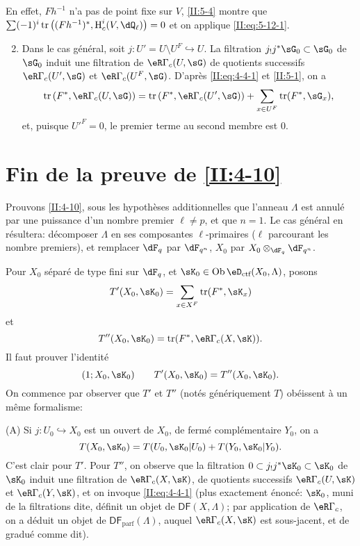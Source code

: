 En effet, $F h^{-1}$ n'a pas de point fixe sur $V$, \ref{II:5-4} montre que 
$\sum (-1)^i \tr\left((F h^{-1})^*,\h_c^i(V,\dQ_\ell)\right)=0$ et on 
applique \eqref{II:eq:5-12-1}.
\begin{enumerate}[\indent A.]
\setcounter{enumi}{1}
  \item Dans le cas général, soit $j:U'=U\setminus U^F\hookrightarrow U$. 
    La filtration  $j_! j^* \sG_0\subset \sG_0$ de $\sG_0$ induit une 
    filtration de $\eR\Gamma_c(U,\sG)$ de quotients successifs 
    $\eR\Gamma_c(U',\sG)$ et $\eR\Gamma_c(U^F,\sG)$. D'après \eqref{II:eq:4-4-1} 
    et \ref{II:5-1}, on a 
    \[
      \tr\left(F^*,\eR\Gamma_c(U,\sG)\right) = \tr\left(F^*,\eR\Gamma_c(U',\sG)\right) + \sum_{x\in U^F} \tr(F^*,\sG_x) \text{,}
    \]
    et, puisque ${U'}^F=0$, le premier terme au second membre est $0$. 
\end{enumerate}










\section{Fin de la preuve de \ref{II:4-10}}\label{II:6}

Prouvons \ref{II:4-10}, sous les hypothèses additionnelles que l'anneau 
$\Lambda$ est annulé par une puissance d'un nombre premier $\ell\ne p$, et 
que $n=1$. Le cas général en résultera: décomposer $\Lambda$ en ses 
composantes $\ell$-primaires ($\ell$ parcourant les nombre premiers), et 
remplacer $\dF_q$ par $\dF_{q^n}$, $X_0$ par $X_0\otimes_{\dF_q}\dF_{q^n}$. 

Pour $X_0$ séparé de type fini sur $\dF_q$, et 
$\sK_0\in\ob\eD_\text{ctf}(X_0,\Lambda)$, posons 
\[
  T'(X_0,\sK_0) = \sum_{x\in X^F} \tr(F^*,\sK_x)
\]
et
\[
  T''(X_0,\sK_0) = \tr(F^*,\eR\Gamma_c(X,\sK)) \text{.}
\]
Il faut prouver l'identité 
\[
  (1;X_0,\sK_0) \qquad T'(X_0,\sK_0) = T''(X_0,\sK_0) \text{.}
\]
On commence par observer que $T'$ et $T''$ (notés génériquement $T$) 
obéissent à un même formalisme:

(A) Si $j:U_0\hookrightarrow X_0$ est un ouvert de $X_0$, de fermé 
complémentaire $Y_0$, on a 
\[
  T(X_0,\sK_0) = T(U_0,\sK_0|U_0) + T(Y_0,\sK_0|Y_0) \text{.}
\]
C'est clair pour $T'$. Pour $T''$, on observe que la filtration 
$0\subset j_! j^* \sK_0\subset \sK_0$ de $\sK_0$ induit une filtration de 
$\eR\Gamma_c(X,\sK)$, de quotients successifs $\eR\Gamma_c(U,\sK)$ et 
$\eR\Gamma_c(Y,\sK)$, et on invoque \eqref{II:eq:4-4-1} (plus exactement 
énoncé: $\sK_0$, muni de la filtrations dite, définit un objet de 
$\mathsf{DF}(X,\Lambda)$; par application de $\eR\Gamma_c$, on a déduit un 
objet de $\mathsf{DF}_\text{parf}(\Lambda)$, auquel $\eR\Gamma_c(X,\sK)$ est 
sous-jacent, et de gradué comme dit). 

